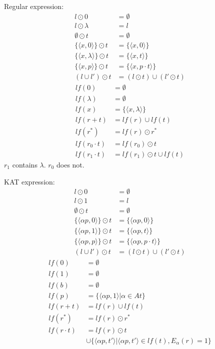 \documentclass[10pt]{article}
\begin{document}
\begin{minipage}{0.45\textwidth}
Regular expression:\\
\begin{align*}
    l\odot 0&=\emptyset\\
    l\odot \lambda&= l\\
    \emptyset\odot t&=\emptyset\\
    \{\langle x,0\rangle\}\odot t&=\{\langle x,0\rangle\}\\
    \{\langle x,\lambda\rangle\}\odot t&=\{\langle x,t\rangle\}\\
    \{\langle x,p\rangle\}\odot t&=\{\langle x,p\cdot t\rangle\}\\
    (l\cup l')\odot t&=(l\odot t)\cup (l'\odot t)
\end{align*}
\begin{align*}
    lf(0)&=\emptyset\\
    lf(\lambda)&=\emptyset\\
    lf(x)&=\{\langle x,\lambda\rangle\}\\
    lf(r+t)&=lf(r)\cup lf(t)\\
    lf(r^*)&=lf(r)\odot r^*\\
    lf(r_0\cdot t)&=lf(r_0)\odot t\\
    lf(r_1\cdot t)&=lf(r_1)\odot t\cup lf(t)
\end{align*}
$r_1$ contains $\lambda$. $r_0$ does not.
\end{minipage}%
\hfill
\begin{minipage}{0.45\textwidth}
KAT expression:\\
\begin{align*}
    l\odot 0&=\emptyset\\
    l\odot 1&= l\\
    \emptyset\odot t&=\emptyset\\
    \{\langle \alpha p,0\rangle\}\odot t&=\{\langle \alpha p,0\rangle\}\\
    \{\langle \alpha p,1\rangle\}\odot t&=\{\langle \alpha p,t\rangle\}\\
    \{\langle \alpha p,p\rangle\}\odot t&=\{\langle \alpha p,p\cdot t\rangle\}\\
    (l\cup l')\odot t&=(l\odot t)\cup (l'\odot t)
\end{align*}
\begin{align*}
    lf(0)&=\emptyset\\
    lf(1)&=\emptyset\\
    lf(b)&=\emptyset\\
    lf(p)&=\{\langle \alpha p,1\rangle|\alpha\in At\}\\
    lf(r+t)&=lf(r)\cup lf(t)\\
    lf(r^*)&=lf(r)\odot r^*\\
    lf(r\cdot t)&=lf(r)\odot t\\
    &\cup \{\langle \alpha p,t'\rangle|\langle \alpha p,t'\rangle\in lf(t), E_{\alpha}(r)=1\}
\end{align*}
\end{minipage}%
\end{document}

